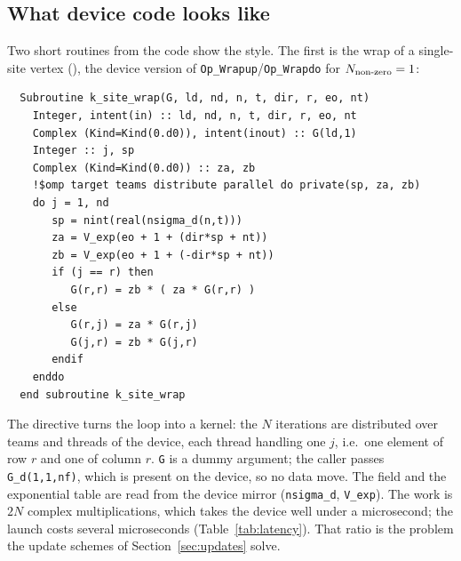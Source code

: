 \subsection{What device code looks like}

Two short routines from the code show the style. The first is the wrap of a single-site vertex (), the device version of \texttt{Op\_Wrapup}/\texttt{Op\_Wrapdo} for $N_{\rm non\text{-}zero}=1$:
\begin{lstlisting}
  Subroutine k_site_wrap(G, ld, nd, n, t, dir, r, eo, nt)
    Integer, intent(in) :: ld, nd, n, t, dir, r, eo, nt
    Complex (Kind=Kind(0.d0)), intent(inout) :: G(ld,1)
    Integer :: j, sp
    Complex (Kind=Kind(0.d0)) :: za, zb
    !$omp target teams distribute parallel do private(sp, za, zb)
    do j = 1, nd
       sp = nint(real(nsigma_d(n,t)))
       za = V_exp(eo + 1 + (dir*sp + nt))
       zb = V_exp(eo + 1 + (-dir*sp + nt))
       if (j == r) then
          G(r,r) = zb * ( za * G(r,r) )
       else
          G(r,j) = za * G(r,j)
          G(j,r) = zb * G(j,r)
       endif
    enddo
  end subroutine k_site_wrap
\end{lstlisting}
The directive turns the loop into a kernel: the $N$ iterations are distributed over teams and threads of the device, each thread handling one $j$, i.e.\ one element of row $r$ and one of column $r$. \texttt{G} is a dummy argument; the caller passes \texttt{G\_d(1,1,nf)}, which is present on the device, so no data move. The field and the exponential table are read from the device mirror (\texttt{nsigma\_d}, \texttt{V\_exp}). The work is $2N$ complex multiplications, which takes the device well under a microsecond; the launch costs several microseconds (Table~\ref{tab:latency}). That ratio is the problem the update schemes of Section~\ref{sec:updates} solve.

